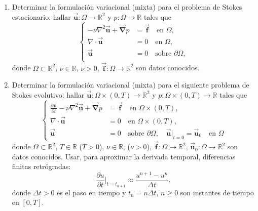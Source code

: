 \documentclass{article}
\newcommand{\Rset}{\mathbb{R}}
\newcommand{\uu}{\vec{\mathbf{u}}}
\newcommand{\ff}{\vec{\mathbf{f}}}
\newcommand{\dt}[1]{\frac{\partial #1}{\partial t}}
\newcommand{\laplace}{\nabla^2}
\newcommand{\grad}{\vec{\mathbf{\nabla}}}
\renewcommand{\div}{\nabla\cdot}
\begin{document}
\begin{titlepage}
\begin{enumerate}
\item %
  Determinar la formulación variacional (mixta) para el problema de
  Stokes estacionario: hallar $\uu:\Omega \to \Rset^2$ y
  $p:\Omega\to\Rset$ tales que
  \begin{equation*}
   \left\{
     \begin{aligned}
       -\nu\laplace\uu + \grad p &= \ff \quad \text{en } \Omega ,\\
       \div\uu &=0 \quad\text{en } \Omega,\\
       \uu &=0 \quad\text{sobre } \partial\Omega,\\
     \end{aligned}
   \right.
 \end{equation*}
 donde $\Omega\subset\Rset^2$, $\nu\in\Rset$, $\nu>0$,
 $\ff:\Omega \to \Rset^2$ son datos conocidos.
\item %
  Determinar la formulación variacional (mixta) para el siguiente
  problema de Stokes evolutivo: hallar $\uu:\Omega\times(0,T) \to \Rset^2$ y
  $p:\Omega\times(0,T)\to\Rset$ tales que
  \begin{equation*}
   \left\{
     \begin{aligned}
       \dt\uu-\nu\laplace\uu + \grad p &= \ff \quad \text{en } \Omega\times(0,T) ,\\
       \div\uu &=0 \quad\text{en } \Omega\times(0,T),\\
       \uu &=0 \quad\text{sobre } \partial\Omega, \quad \uu|_{t=0}=\uu_0\quad \text{en } \Omega
     \end{aligned}
   \right.
 \end{equation*}
 donde $\Omega\subset\Rset^2$, $T\in\Rset$ ($T>0$), $\nu\in\Rset$,
 ($\nu>0$), $\ff:\Omega \to \Rset^2$, $\uu_0:\Omega \to \Rset^2$ son
 datos conocidos. Usar, para aproximar la derivada temporal,
 diferencias finitas retrógradas:
 $$
 \dt{u}|_{t=t_{n+1}} \approx \frac{u^{n+1}-u^n}{\Delta t},
 $$
 donde $\Delta t>0$ es el paso en tiempo y $t_n=n\Delta t$, $n\ge 0$
 son instantes de tiempo en $[0,T]$.
\end{enumerate}



\end{titlepage}
\end{document}
